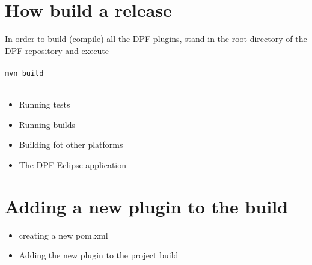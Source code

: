 \documentclass[a4paper]{article}
\newcommand{\code}[1]{\\ \\ \texttt{#1} \\ \\ }
\begin{document}
\section{How build a release}

In order to build (compile) all the DPF plugins, stand in the root directory of the DPF repository and execute \code{mvn build}




\begin{itemize}
\item Running tests
\item Running builds
\item Building fot other platforms
\item The DPF Eclipse application
\end{itemize}

\section{Adding a new plugin to the build}

\begin{itemize}
 \item creating a new pom.xml
 \item Adding the new plugin to the project build
\end{itemize}
\end{document}
